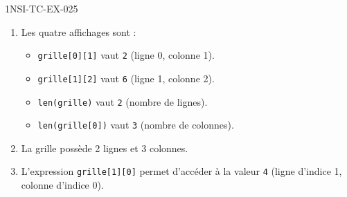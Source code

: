 \begin{corrige}{1NSI-TC-EX-025}
\begin{enumerate}
  \item Les quatre affichages sont :
  \begin{itemize}
    \item \lstinline{grille[0][1]} vaut \lstinline{2} (ligne 0, colonne 1).
    \item \lstinline{grille[1][2]} vaut \lstinline{6} (ligne 1, colonne 2).
    \item \lstinline{len(grille)} vaut \lstinline{2} (nombre de lignes).
    \item \lstinline{len(grille[0])} vaut \lstinline{3} (nombre de colonnes).
  \end{itemize}

  \item La grille possède 2 lignes et 3 colonnes.

  \item L'expression \lstinline{grille[1][0]} permet d'accéder à la valeur \lstinline{4} (ligne d'indice 1, colonne d'indice 0).
\end{enumerate}
\end{corrige}
